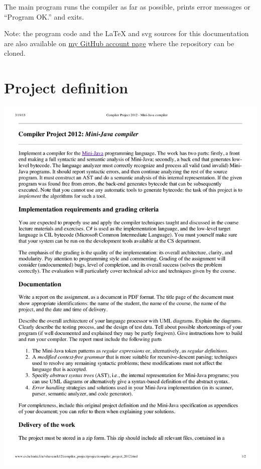 \documentclass[a4paper,11pt]{article}
\begin{document}
The main program runs the compiler as far as possible, prints error messages or ``Program OK.'' and exits.

Note: the program code and the \LaTeX{} and svg sources for this documentation are also available on \href{https://github.com/Lateks/MiniJavaCompiler}{my GitHub account page} where the repository can be cloned.

\appendix
\section{Project definition}

\includegraphics[width=1.0\textwidth,page=1]{project.pdf}
\end{document}
